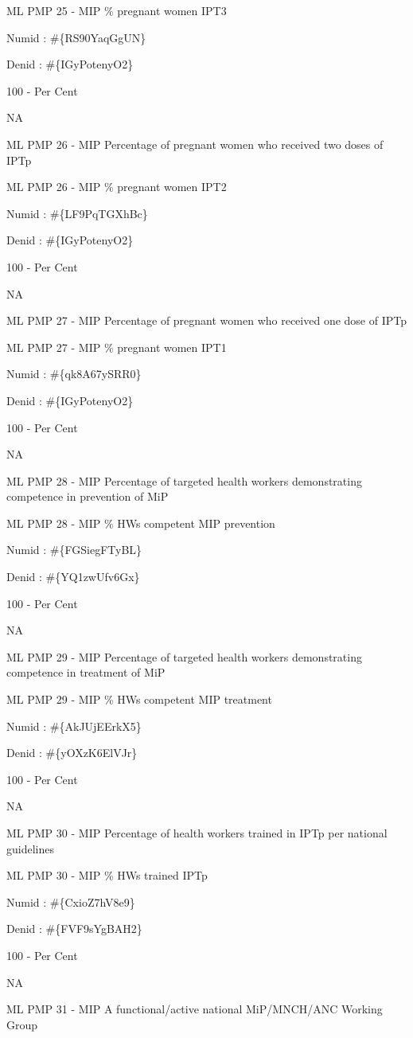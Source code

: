 \documentclass[]{book}
\begin{document}
ML PMP 25 - MIP \% pregnant women IPT3

Numid : \#\{RS90YaqGgUN\}

Denid : \#\{IGyPotenyO2\}

100 - Per Cent

NA

ML PMP 26 - MIP Percentage of pregnant women who received two doses of IPTp

ML PMP 26 - MIP \% pregnant women IPT2

Numid : \#\{LF9PqTGXhBc\}

Denid : \#\{IGyPotenyO2\}

100 - Per Cent

NA

ML PMP 27 - MIP Percentage of pregnant women who received one dose of IPTp

ML PMP 27 - MIP \% pregnant women IPT1

Numid : \#\{qk8A67ySRR0\}

Denid : \#\{IGyPotenyO2\}

100 - Per Cent

NA

ML PMP 28 - MIP Percentage of targeted health workers demonstrating competence in prevention of MiP

ML PMP 28 - MIP \% HWs competent MIP prevention

Numid : \#\{FGSiegFTyBL\}

Denid : \#\{YQ1zwUfv6Gx\}

100 - Per Cent

NA

ML PMP 29 - MIP Percentage of targeted health workers demonstrating competence in treatment of MiP

ML PMP 29 - MIP \% HWs competent MIP treatment

Numid : \#\{AkJUjEErkX5\}

Denid : \#\{yOXzK6ElVJr\}

100 - Per Cent

NA

ML PMP 30 - MIP Percentage of health workers trained in IPTp per national guidelines

ML PMP 30 - MIP \% HWs trained IPTp

Numid : \#\{CxioZ7hV8e9\}

Denid : \#\{FVF9sYgBAH2\}

100 - Per Cent

NA

ML PMP 31 - MIP A functional/active national MiP/MNCH/ANC Working Group
\end{document}
